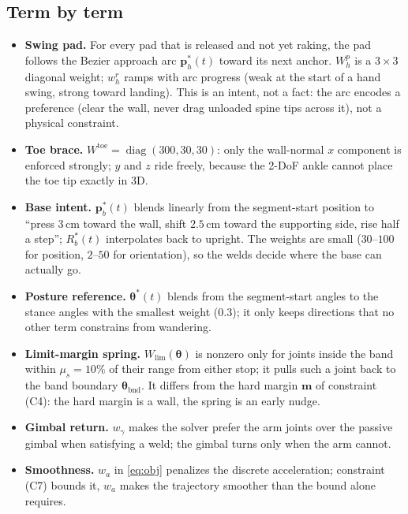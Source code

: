 \documentclass[11pt]{article}
\DeclareMathOperator{\diag}{diag}
\begin{document}
\subsection*{Term by term}
\begin{itemize}[leftmargin=1.6em]
\item \textbf{Swing pad.} For every pad that is released and not yet raking,
      the pad follows the Bezier approach arc $\bm p^*_h(t)$ toward its next
      anchor. $W^p_h$ is a $3\times3$ diagonal weight; $w^r_h$ ramps with
      arc progress (weak at the start of a hand swing, strong toward
      landing). This is an intent, not a fact: the arc encodes a preference
      (clear the wall, never drag unloaded spine tips across it), not a
      physical constraint.
\item \textbf{Toe brace.} $W^{\mathrm{toe}}=\diag(300,30,30)$: only the
      wall-normal $x$ component is enforced strongly; $y$ and $z$ ride
      freely, because the 2-DoF ankle cannot place the toe tip exactly in
      3D.
\item \textbf{Base intent.} $\bm p^*_b(t)$ blends linearly from the
      segment-start position to ``press $3$\,cm toward the wall, shift
      $2.5$\,cm toward the supporting side, rise half a step''; $R^*_b(t)$
      interpolates back to upright. The weights are small ($30$--$100$ for
      position, $2$--$50$ for orientation), so the welds decide where the
      base can actually go.
\item \textbf{Posture reference.} $\bm\theta^*(t)$ blends from the
      segment-start angles to the stance angles with the smallest weight
      ($0.3$); it only keeps directions that no other term constrains from
      wandering.
\item \textbf{Limit-margin spring.} $W_{\mathrm{lim}}(\bm\theta)$ is
      nonzero only for joints inside the band within $\mu_s=10\%$ of their
      range from either stop; it pulls such a joint back to the band
      boundary $\bm\theta_{\mathrm{bnd}}$. It differs from the hard margin
      $\bm m$ of constraint (C4): the hard margin is a wall, the spring is
      an early nudge.
\item \textbf{Gimbal return.} $w_\gamma$ makes the solver prefer the arm
      joints over the passive gimbal when satisfying a weld; the gimbal
      turns only when the arm cannot.
\item \textbf{Smoothness.} $w_a$ in \eqref{eq:obj} penalizes the discrete
      acceleration; constraint (C7) bounds it, $w_a$ makes the trajectory
      smoother than the bound alone requires.
\end{itemize}
\end{document}
